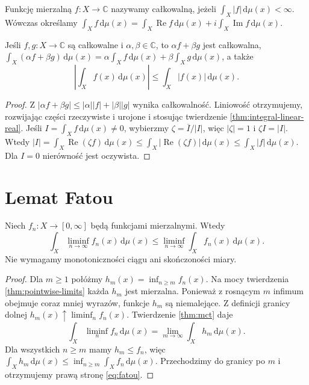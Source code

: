 \begin{definicja}
\label{def:complex-integral}
Funkcję mierzalną $f:X\to\mathbb C$ nazywamy
całkowalną, jeżeli $\int_X|f|\,\mathrm d\mu(x)<\infty$.
Wówczas określamy
$\int_Xf\,\mathrm d\mu(x)=
\int_X\operatorname{Re}f\,\mathrm d\mu(x)+
 i\int_X\operatorname{Im}f\,\mathrm d\mu(x)$.
\end{definicja}

\begin{twierdzenie}
\label{thm:integral-complex-linear}
Jeśli $f,g:X\to\mathbb C$ są całkowalne i
$\alpha,\beta\in\mathbb C$, to $\alpha f+\beta g$
jest całkowalna,
$\int_X(\alpha f+\beta g)\,\mathrm d\mu(x)=
\alpha\int_Xf\,\mathrm d\mu(x)+
\beta\int_Xg\,\mathrm d\mu(x)$, a także
\[
\left|\int_Xf(x)\,\mathrm d\mu(x)\right|
\le\int_X|f(x)|\,\mathrm d\mu(x).
\]
\end{twierdzenie}
\begin{proof}
Z $|\alpha f+\beta g|\le|\alpha||f|+|\beta||g|$
wynika całkowalność. Liniowość otrzymujemy,
rozwijając części rzeczywiste i urojone i stosując
twierdzenie \ref{thm:integral-linear-real}.
Jeśli $I=\int_Xf\,\mathrm d\mu(x)\ne0$, wybierzmy
$\zeta=\overline I/|I|$, więc $|\zeta|=1$ i
$\zeta I=|I|$. Wtedy
$|I|=\int_X\operatorname{Re}(\zeta f)\,\mathrm d\mu(x)
\le\int_X|\operatorname{Re}(\zeta f)|\,\mathrm d\mu(x)
\le\int_X|f|\,\mathrm d\mu(x)$.
Dla $I=0$ nierówność jest oczywista.
\end{proof}

\section{Lemat Fatou}

\begin{twierdzenie}
\label{thm:fatou}
Niech $f_n:X\to[0,\infty]$ będą funkcjami mierzalnymi.
Wtedy
\begin{equation}\label{eq:fatou}
\int_X\liminf_{n\to\infty}f_n(x)\,\mathrm d\mu(x)
\le\liminf_{n\to\infty}\int_Xf_n(x)\,\mathrm d\mu(x).
\end{equation}
Nie wymagamy monotoniczności ciągu ani skończoności miary.
\end{twierdzenie}
\begin{proof}
Dla $m\ge1$ połóżmy
$h_m(x)=\inf_{n\ge m}f_n(x)$.
Na mocy twierdzenia \ref{thm:pointwise-limits}
każda $h_m$ jest mierzalna. Ponieważ z rosnącym $m$
infimum obejmuje coraz mniej wyrazów, funkcje $h_m$
są niemalejące. Z definicji granicy dolnej
$h_m(x)\uparrow\liminf_nf_n(x)$.
Twierdzenie \ref{thm:mct} daje
\[
\int_X\liminf_nf_n\,\mathrm d\mu(x)
=\lim_{m\to\infty}\int_Xh_m\,\mathrm d\mu(x).
\]
Dla wszystkich $n\ge m$ mamy $h_m\le f_n$, więc
$\int_Xh_m\,\mathrm d\mu(x)\le
\inf_{n\ge m}\int_Xf_n\,\mathrm d\mu(x)$.
Przechodzimy do granicy po $m$ i otrzymujemy
prawą stronę \eqref{eq:fatou}.
\end{proof}

